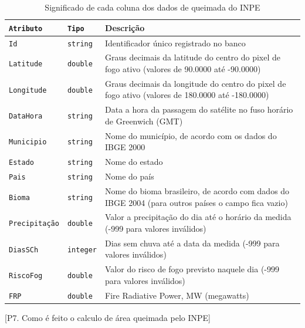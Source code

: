 \documentclass[cic,tc]{iiufrgs}
\begin{document}
\begin{table}[htbp]
\centering
\caption{Significado de cada coluna dos dados de queimada do INPE}
\begin{tabular}{@{}llp{9cm}@{}}
 \toprule
 \texttt{Atributo} & \texttt{Tipo} & Descrição \\
 \midrule
 \texttt{Id} & \texttt{string} & Identificador único registrado no banco \\
 \texttt{Latitude} & \texttt{double} & Graus decimais da latitude do centro 
                     do pixel de fogo ativo (valores de 90.0000 até -90.0000) \\ 
 \texttt{Longitude} & \texttt{double} & Graus decimais da longitude do centro 
                     do pixel de fogo ativo (valores de 180.0000 até -180.0000) \\  
 \texttt{DataHora} & \texttt{string} & Data a hora da passagem do satélite no fuso 
                     horário de Greenwich (GMT) \\   
 \texttt{Municipio} & \texttt{string} & Nome do município, de acordo com os dados 
                     do IBGE 2000 \\
 \texttt{Estado} & \texttt{string} & Nome do estado \\
 \texttt{Pais} & \texttt{string} & Nome do país \\  
 \texttt{Bioma} & \texttt{string} & Nome do bioma brasileiro, de acordo com 
                     dados do IBGE 2004 (para outros países o campo fica vazio) \\
 \texttt{Precipitação} & \texttt{double} & Valor a precipitação do dia até 
                     o horário da medida (-999 para valores inválidos) \\
 \texttt{DiasSCh} & \texttt{integer} & Dias sem chuva até a data da medida 
                     (-999 para valores inválidos) \\
 \texttt{RiscoFog} & \texttt{double} & Valor do risco de fogo previsto naquele dia 
                     (-999 para valores inválidos) \\
 \texttt{FRP} & \texttt{double} & Fire Radiative Power, MW (megawatts) \\
 \bottomrule
\end{tabular}
\label{table:inpeColumns}
\end{table}

[P7. Como é feito o calculo de área queimada pelo INPE] \par
\end{document}
